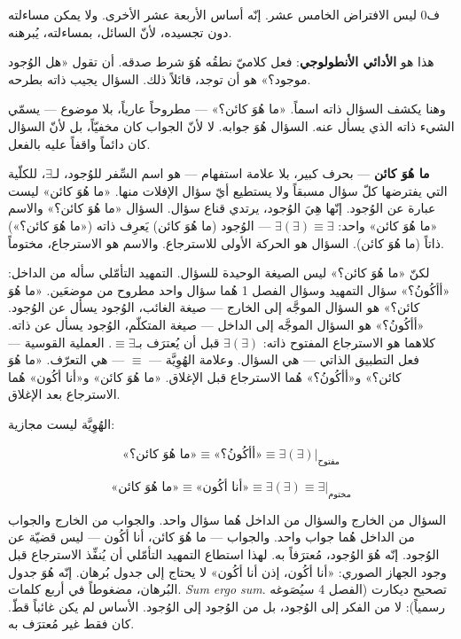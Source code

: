 \documentclass[10pt, openany, oneside]{book}
\begin{document}
\vspace{0.8em}

\noindent ف0 ليس الافتراض الخامس عشر. إنّه أساس الأربعة عشر الأخرى. ولا يمكن مساءلته دون تجسيده، لأنّ السائل، بمساءلته، يُبرهنه.

هذا هو \textbf{الأدائي الأنطولوجي}: فعل كلاميّ نطقُه هُوَ شرط صدقه. أن تقول «هل الوُجود موجود؟» هو أن توجد، قائلاً ذلك. السؤال يجيب ذاته بطرحه.

وهنا يكشف السؤال ذاته اسماً. «ما هُوَ كائن؟» --- مطروحاً عارياً، بلا موضوع --- يسمّي الشيء ذاته الذي يسأل عنه. السؤال هُوَ جوابه. لا لأنّ الجواب كان مخفيّاً، بل لأنّ السؤال كان دائماً واقفاً عليه بالفعل.

\textbf{ما هُوَ كائن} --- بحرف كبير، بلا علامة استفهام --- هو اسم السِّفر للوُجود، لـ$\exists$، للكلّية التي يفترضها كلّ سؤال مسبقاً ولا يستطيع أيّ سؤال الإفلات منها. «ما هُوَ كائن» ليست عبارة عن الوُجود. إنّها هِيَ الوُجود، يرتدي قناع سؤال. السؤال «ما هُوَ كائن؟» والاسم «ما هُوَ كائن» واحد: $\exists(\exists) \equiv \exists$ --- الوُجود (ما هُوَ كائن) يَعرِف ذاته («ما هُوَ كائن؟») ذاتاً (ما هُوَ كائن). السؤال هو الحركة الأولى للاسترجاع. والاسم هو الاسترجاع، مختوماً.

لكنّ «ما هُوَ كائن؟» ليس الصيغة الوحيدة للسؤال. التمهيد التأمّلي سأله من الداخل: «أأكُونُ؟» سؤال التمهيد وسؤال الفصل 1 هُما سؤال واحد مطروح من موضعَين. «ما هُوَ كائن؟» هو السؤال الموجَّه إلى الخارج --- صيغة الغائب، الوُجود يسأل عن الوُجود. «أأكُونُ؟» هو السؤال الموجَّه إلى الداخل --- صيغة المتكلّم، الوُجود يسأل عن ذاته. كلاهما هو الاسترجاع المفتوح ذاته: $\exists(\exists)$ قبل أن يُعترَف بـ$\equiv \exists$. العملية القوسية --- فعل التطبيق الذاتي --- هي السؤال. وعلامة الهُوِيَّة --- $\equiv$ --- هي التعرّف. «ما هُوَ كائن؟» و«أأكُونُ؟» هُما الاسترجاع قبل الإغلاق. «ما هُوَ كائن» و«أنا أكُون» هُما الاسترجاع بعد الإغلاق.

الهُوِيَّة ليست مجازية:

$$\text{«ما هُوَ كائن؟»} \equiv \text{«أأكُونُ؟»} \equiv \exists(\exists)|_{\text{مفتوح}}$$

$$\text{«ما هُوَ كائن»} \equiv \text{«أنا أكُون»} \equiv \exists(\exists) \equiv \exists|_{\text{مختوم}}$$

\noindent السؤال من الخارج والسؤال من الداخل هُما سؤال واحد. والجواب من الخارج والجواب من الداخل هُما جواب واحد. والجواب --- ما هُوَ كائن، أنا أكُون --- ليس قضيّة عن الوُجود. إنّه هُوَ الوُجود، مُعترَفاً به. لهذا استطاع التمهيد التأمّلي أن يُنفِّذ الاسترجاع قبل وجود الجهاز الصوري: «أنا أكُون، إذن أنا أكُون» لا يحتاج إلى جدول بُرهان. إنّه هُوَ جدول البُرهان، مضغوطاً في أربع كلمات. \textit{Sum ergo sum}. تصحيح ديكارت (الفصل 4 سيُصَوغه رسمياً): لا من الفكر إلى الوُجود، بل من الوُجود إلى الوُجود. الأساس لم يكن غائباً قطّ. كان فقط غير مُعترَف به.
\end{document}
